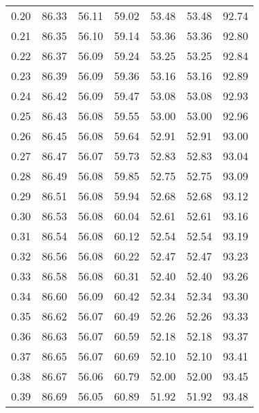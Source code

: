 \begin{tabular}{|c|c|c|c|c|c|c|}
      0.20 &     86.33 &     56.11 &      59.02 &   53.48 &      53.48 &         92.74 \\
      0.21 &     86.35 &     56.10 &      59.14 &   53.36 &      53.36 &         92.80 \\
      0.22 &     86.37 &     56.09 &      59.24 &   53.25 &      53.25 &         92.84 \\
      0.23 &     86.39 &     56.09 &      59.36 &   53.16 &      53.16 &         92.89 \\
      0.24 &     86.42 &     56.09 &      59.47 &   53.08 &      53.08 &         92.93 \\
      0.25 &     86.43 &     56.08 &      59.55 &   53.00 &      53.00 &         92.96 \\
      0.26 &     86.45 &     56.08 &      59.64 &   52.91 &      52.91 &         93.00 \\
      0.27 &     86.47 &     56.07 &      59.73 &   52.83 &      52.83 &         93.04 \\
      0.28 &     86.49 &     56.08 &      59.85 &   52.75 &      52.75 &         93.09 \\
      0.29 &     86.51 &     56.08 &      59.94 &   52.68 &      52.68 &         93.12 \\
      0.30 &     86.53 &     56.08 &      60.04 &   52.61 &      52.61 &         93.16 \\
      0.31 &     86.54 &     56.08 &      60.12 &   52.54 &      52.54 &         93.19 \\
      0.32 &     86.56 &     56.08 &      60.22 &   52.47 &      52.47 &         93.23 \\
      0.33 &     86.58 &     56.08 &      60.31 &   52.40 &      52.40 &         93.26 \\
      0.34 &     86.60 &     56.09 &      60.42 &   52.34 &      52.34 &         93.30 \\
      0.35 &     86.62 &     56.07 &      60.49 &   52.26 &      52.26 &         93.33 \\
      0.36 &     86.63 &     56.07 &      60.59 &   52.18 &      52.18 &         93.37 \\
      0.37 &     86.65 &     56.07 &      60.69 &   52.10 &      52.10 &         93.41 \\
      0.38 &     86.67 &     56.06 &      60.79 &   52.00 &      52.00 &         93.45 \\
      0.39 &     86.69 &     56.05 &      60.89 &   51.92 &      51.92 &         93.48 \\

\end{tabular}
